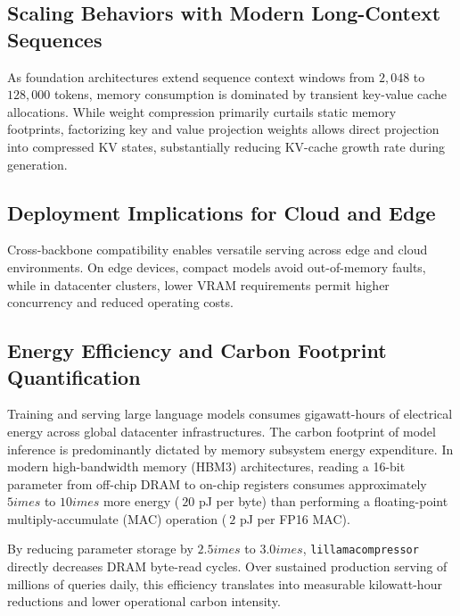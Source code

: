 \subsection{Scaling Behaviors with Modern Long-Context Sequences}
As foundation architectures extend sequence context windows from $2{,}048$ to $128{,}000$ tokens, memory consumption is dominated by transient key-value cache allocations. While weight compression primarily curtails static memory footprints, factorizing key and value projection weights allows direct projection into compressed KV states, substantially reducing KV-cache growth rate during generation.

\subsection{Deployment Implications for Cloud and Edge}
Cross-backbone compatibility enables versatile serving across edge and cloud environments. On edge devices, compact models avoid out-of-memory faults, while in datacenter clusters, lower VRAM requirements permit higher concurrency and reduced operating costs.

\subsection{Energy Efficiency and Carbon Footprint Quantification}
Training and serving large language models consumes gigawatt-hours of electrical energy across global datacenter infrastructures. The carbon footprint of model inference is predominantly dictated by memory subsystem energy expenditure. In modern high-bandwidth memory (HBM3) architectures, reading a 16-bit parameter from off-chip DRAM to on-chip registers consumes approximately $5	imes$ to $10	imes$ more energy ($~20$ pJ per byte) than performing a floating-point multiply-accumulate (MAC) operation ($~2$ pJ per FP16 MAC).

By reducing parameter storage by $2.5	imes$ to $3.0	imes$, \texttt{lillamacompressor} directly decreases DRAM byte-read cycles. Over sustained production serving of millions of queries daily, this efficiency translates into measurable kilowatt-hour reductions and lower operational carbon intensity.
